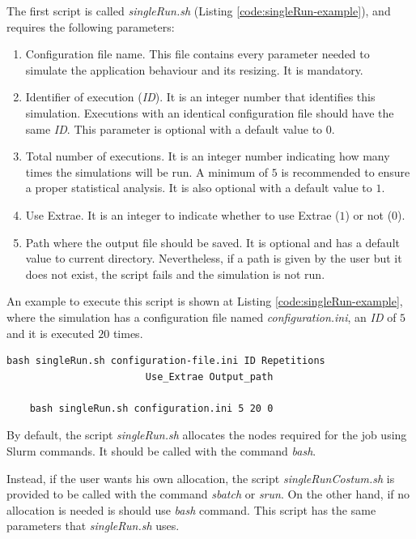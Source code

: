 The first script is called \textit{singleRun.sh} (Listing \ref{code:singleRun-example}), and requires the following parameters:
\begin{enumerate}
    \item Configuration file name. This file contains every parameter needed to simulate the application behaviour and its resizing. It is mandatory.
    \item Identifier of execution (\textit{ID}). It is an integer number that identifies this simulation. Executions with an identical configuration file should have the same \textit{ID}. This parameter is optional with a default value to 0.
    \item Total number of executions. It is an integer number indicating how many times the simulations will be run. A minimum of $5$ is recommended to ensure  a proper statistical analysis. It is also optional with a default value to $1$.
    \item Use Extrae. It is an integer to indicate whether to use Extrae ($1$) or not ($0$).
    \item Path where the output file should be saved. It is optional and has a default value to current directory.  Nevertheless, if a path is given by the user but it does not exist, the script fails and the simulation is not run. 
\end{enumerate}
An example to execute this script is shown at Listing \ref{code:singleRun-example}, where the simulation has a configuration file named \textit{configuration.ini}, an \textit{ID} of $5$ and it  is executed $20$ times.

\begin{lstlisting}[float,caption=Script \textit{singleRun.sh} example of use., label=code:singleRun-example, captionpos=b]
    bash singleRun.sh configuration-file.ini ID Repetitions
                        Use_Extrae Output_path
            
    bash singleRun.sh configuration.ini 5 20 0
\end{lstlisting}

By default, the script \textit{singleRun.sh} allocates the nodes required for the job using Slurm commands. It should be called with the command \textit{bash}. 

Instead, if the user wants his own allocation, the script \textit{singleRunCostum.sh} is provided to be called with the command \textit{sbatch} or \textit{srun}. On the other hand, if no allocation is needed is should use \textit{bash} command. This script has the same parameters that \textit{singleRun.sh} uses. 

